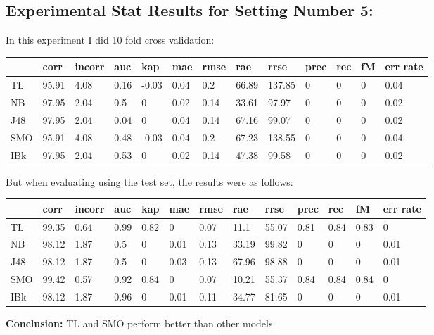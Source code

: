 \documentclass[a4paper,12pt, english]{article}
\begin{document}
\subsection{Experimental Stat Results for Setting Number 5:}
In this experiment I did 10 fold cross validation:
\begin{small}
\begin{center}
    \begin{tabular}{ | l | l | l | l | l | l | l | l | l | l | l | l | l |}
    \hline
      	& corr & incorr  & auc & kap & mae & rmse & rae & rrse & prec & rec & fM & err rate\\ \hline
      	TL & 95.91 & 4.08 & 0.16 & -0.03 & 0.04 & 0.2 & 66.89 & 137.85 & 0 & 0 & 0 & 0.04\\ \hline
	NB & 97.95 & 2.04 & 0.5 & 0 & 0.02 & 0.14 & 33.61 & 97.97 & 0 & 0 & 0 & 0.02\\ \hline
	J48 & 97.95 & 2.04 & 0.04 & 0 & 0.04 & 0.14 & 67.16 & 99.07 & 0 & 0 & 0 & 0.02\\ \hline
	SMO & 95.91 & 4.08 & 0.48 & -0.03 & 0.04 & 0.2 & 67.23 & 138.55 & 0 & 0 & 0 & 0.04\\ \hline
	IBk & 97.95 & 2.04 & 0.53 & 0 & 0.02 & 0.14 & 47.38 & 99.58 & 0 & 0 & 0 & 0.02\\ \hline  
    \end{tabular}       
\end{center}
\end{small}

But when evaluating using the test set, the results were as follows:
\begin{small}
\begin{center}
    \begin{tabular}{ | l | l | l | l | l | l | l | l | l | l | l | l | l |}
    \hline
      	& corr & incorr  & auc & kap & mae & rmse & rae & rrse & prec & rec & fM & err rate\\ \hline
      	TL & 99.35 & 0.64 & 0.99 & 0.82 & 0 & 0.07 & 11.1 & 55.07 & 0.81 & 0.84 & 0.83 & 0\\ \hline
	NB & 98.12 & 1.87 & 0.5 & 0 & 0.01 & 0.13 & 33.19 & 99.82 & 0 & 0 & 0 & 0.01\\ \hline
	J48 & 98.12 & 1.87 & 0.5 & 0 & 0.03 & 0.13 & 67.96 & 98.88 & 0 & 0 & 0 & 0.01\\ \hline
	SMO & 99.42 & 0.57 & 0.92 & 0.84 & 0 & 0.07 & 10.21 & 55.37 & 0.84 & 0.84 & 0.84 & 0\\ \hline
	IBk & 98.12 & 1.87 & 0.96 & 0 & 0.01 & 0.11 & 34.77 & 81.65 & 0 & 0 & 0 & 0.01\\ \hline  
    \end{tabular}       
\end{center}
\end{small}
\textbf{Conclusion:} TL and SMO perform better than other models
\end{document}
